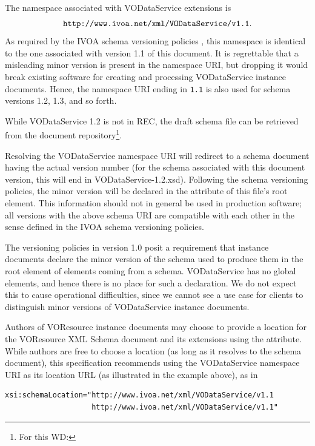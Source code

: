 \documentclass[11pt,a4paper]{ivoa}
\begin{document}
The namespace associated with VODataService extensions is
$$\mbox{\texttt{http://www.ivoa.net/xml/VODataService/v1.1}}.$$
As required by the IVOA schema versioning policies
\citep{2018ivoa.spec.0529H}, this namespace is identical to the one
associated with version 1.1 of this document.  It is regrettable that a
misleading minor version is present in the namespace URI, but dropping
it would break existing software for creating and processing
VODataService instance documents.  Hence, the namespace URI ending in
\verb|1.1| is also used for schema versions 1.2, 1.3, and so forth.

While VODataService 1.2 is not in REC, the draft schema file can be retrieved from the document
repository\footnote{For this WD: }.

Resolving the VODataService namespace URI will redirect to a schema
document having the actual version number (for the schema associated
with this document version, this will end in VODataService-1.2.xsd).
Following the schema versioning policies, the minor version will be
declared in the  attribute of this file's root element.
This information should not in general be used in production software;
all versions with the above schema URI are compatible with each
other in the sense defined in the IVOA schema versioning policies.

The versioning policies in version 1.0 posit a requirement that instance
documents declare the minor version of the schema used to produce them
in the root element of elements coming from a schema.  VODataService has
no global elements, and hence there is no place for such a declaration.
We do not expect this to cause operational difficulties, since we cannot
see a use case for clients to distinguish minor versions of
VODataService instance documents.


Authors of VOResource instance documents may choose to
provide a location for the VOResource XML Schema document and its
extensions using the
 attribute.  While authors are free to
choose a location (as long as it resolves to the schema document), this
specification
recommends using the VODataService namespace URI as its location URL
(as illustrated in the example above), as in
\begin{verbatim}
xsi:schemaLocation="http://www.ivoa.net/xml/VODataService/v1.1
                    http://www.ivoa.net/xml/VODataService/v1.1"
\end{verbatim}
\end{document}
